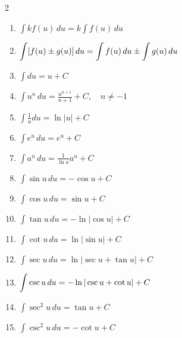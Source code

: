 \documentclass[12pt, letterpaper]{article}
\begin{document}
\begin{definition}[title=Basic Integration Rules ($a>0$)]

    \setlength{\columnsep}{1cm}
    
    \begin{multicols}{2}
    \begin{enumerate}
    \item $\displaystyle \int k f(u)\,du = k\int f(u)\,du$
    
    \item $\displaystyle \int [f(u)\pm g(u)]\,du
    \\ = \int f(u)\,du \pm \int g(u)\,du$
    
    \item $\displaystyle \int du = u + C$
    
    \item $\displaystyle \int u^{n}\,du
    = \frac{u^{n+1}}{n+1}+C,\quad n\neq -1$
    
    \item $\displaystyle \int \frac{1}{u}du
    = \ln|u|+C$
    
    \item $\displaystyle \int e^{u}\,du
    = e^{u}+C$
    
    \item $\displaystyle \int a^{u}\,du
    = \frac{1}{\ln a}a^{u}+C$
    
    \item $\displaystyle \int \sin u\,du
    = -\cos u + C$
    
    \item $\displaystyle \int \cos u\,du
    = \sin u + C$
    
    \item $\displaystyle \int \tan u\,du
    = -\ln|\cos u| + C$
    
    \item $\displaystyle \int \cot u\,du
    = \ln|\sin u| + C$
    
    \item $\displaystyle \int \sec u\,du
    = \ln|\sec u + \tan u| + C$
    
    \item $\displaystyle \int \csc u\,du
    \\= -\ln|\csc u + \cot u| + C$
    
    \item $\displaystyle \int \sec^{2}u\,du
    = \tan u + C$
    
    \item $\displaystyle \int \csc^{2}u\,du
    = -\cot u + C$
    

\end{enumerate}
\end{multicols}
\end{definition}
\end{document}
